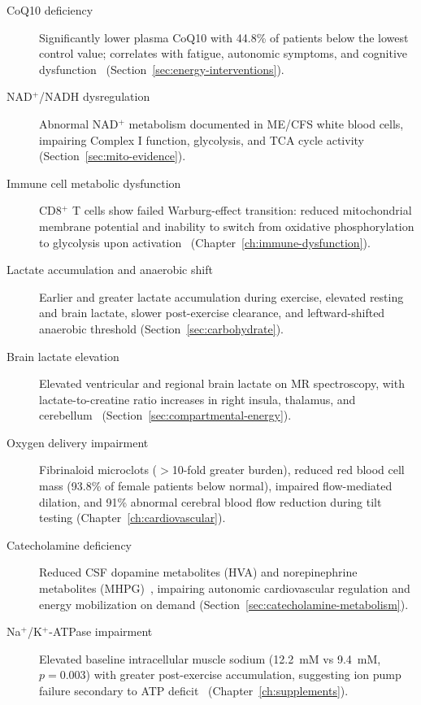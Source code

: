 \begin{description}
    \item[CoQ10 deficiency] Significantly lower plasma CoQ10 with 44.8\% of patients below the lowest control value; correlates with fatigue, autonomic symptoms, and cognitive dysfunction~\cite{Maes2009CoQ10} (Section~\ref{sec:energy-interventions}).

    \item[NAD$^+$/NADH dysregulation] Abnormal NAD$^+$ metabolism documented in ME/CFS white blood cells, impairing Complex I function, glycolysis, and TCA cycle activity~\cite{heng2025mecfs} (Section~\ref{sec:mito-evidence}).

    \item[Immune cell metabolic dysfunction] CD8$^+$ T cells show failed Warburg-effect transition: reduced mitochondrial membrane potential and inability to switch from oxidative phosphorylation to glycolysis upon activation~\cite{Mandarano2020} (Chapter~\ref{ch:immune-dysfunction}).

    \item[Lactate accumulation and anaerobic shift] Earlier and greater lactate accumulation during exercise, elevated resting and brain lactate, slower post-exercise clearance, and leftward-shifted anaerobic threshold (Section~\ref{sec:carbohydrate}).

    \item[Brain lactate elevation] Elevated ventricular and regional brain lactate on MR spectroscopy, with lactate-to-creatine ratio increases in right insula, thalamus, and cerebellum~\cite{Shungu2012glutathione} (Section~\ref{sec:compartmental-energy}).

    \item[Oxygen delivery impairment] Fibrinaloid microclots ($>$10-fold greater burden), reduced red blood cell mass (93.8\% of female patients below normal), impaired flow-mediated dilation, and 91\% abnormal cerebral blood flow reduction during tilt testing (Chapter~\ref{ch:cardiovascular}).

    \item[Catecholamine deficiency] Reduced CSF dopamine metabolites (HVA) and norepinephrine metabolites (MHPG)~\cite{walitt2024deep}, impairing autonomic cardiovascular regulation and energy mobilization on demand (Section~\ref{sec:catecholamine-metabolism}).

    \item[Na$^+$/K$^+$-ATPase impairment] Elevated baseline intracellular muscle sodium (12.2~mM vs 9.4~mM, $p=0.003$) with greater post-exercise accumulation, suggesting ion pump failure secondary to ATP deficit~\cite{Petter2022sodium} (Chapter~\ref{ch:supplements}).
\end{description}

